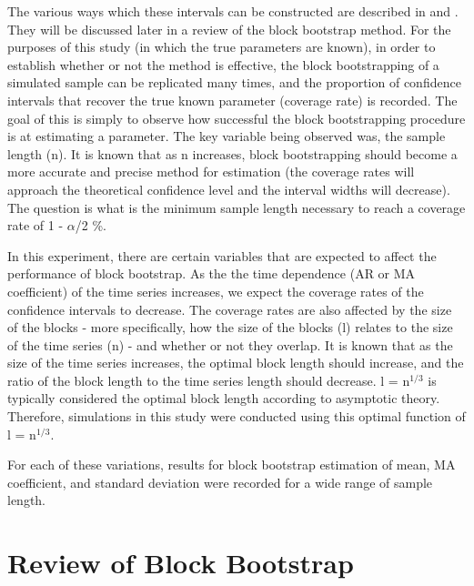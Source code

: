 \documentclass[12pt, letterpaper, titlepage]{article}
\begin{document}
The various ways which these intervals can be constructed are described in \citet{diciccio1996bootstrap} and \citet{rice2006mathematical}. They will be discussed later in a review of the block bootstrap method. For the purposes of this study (in which the true parameters are known), in order to establish whether or not the method is effective, the block bootstrapping of a simulated sample can be replicated many times, 
and the proportion of confidence intervals that recover the true known parameter 
(coverage rate) is recorded. The goal of this is simply to observe how successful the block bootstrapping procedure
is at estimating a parameter. The key variable being observed was, the sample length (n). It is known that as n
increases, block bootstrapping should become a more accurate and precise method for estimation
(the coverage rates will approach the theoretical confidence level and the interval widths will decrease). The question is what is the minimum sample length necessary to reach a coverage rate of 1 - $\alpha$/2 \%.

In this experiment, there are certain variables that are expected to affect the performance of block bootstrap. As the the time dependence (AR or MA coefficient) of the time series 
increases, we expect the coverage rates of the confidence intervals to decrease.
The coverage rates are also affected by the size of the blocks - more specifically,
how the size of the blocks (l) relates to the size of the time series (n) - 
and whether or not they overlap. It is known that as the size of the time series 
increases, the optimal block length should increase, and the ratio of the block length to 
the time series length should decrease. l = n$^{1/3}$ is typically considered the optimal 
block length according to asymptotic theory. \citep{buhlmann1999block} Therefore, simulations in this study were conducted using this optimal function of l = n$^{1/3}$. 


For each of these variations, results for block bootstrap estimation of mean, MA coefficient, and standard deviation were recorded for a wide range of sample length.

\section{Review of Block Bootstrap}
\label{sec:blkbootreview}
\end{document}
